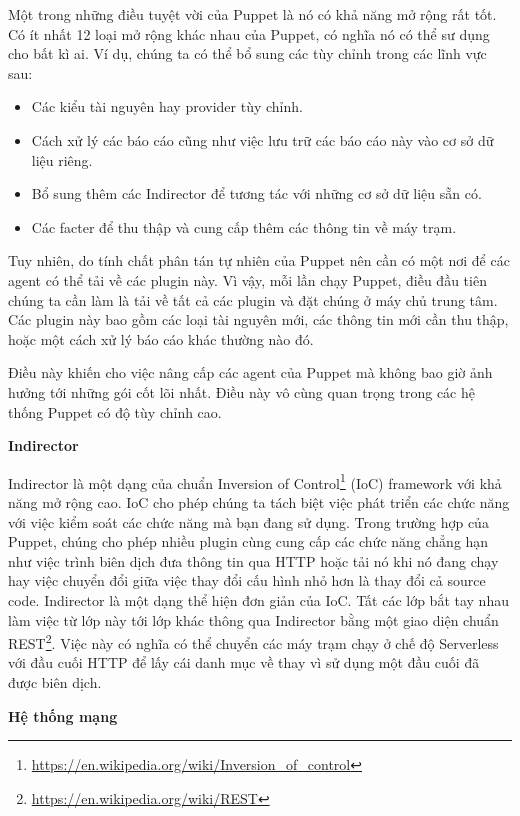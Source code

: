 Một trong những điều tuyệt vời của Puppet là nó có khả năng mở rộng rất tốt. Có ít nhất 12 loại mở rộng khác nhau của Puppet, có nghĩa nó có thể sư dụng cho bất kì ai. Ví dụ, chúng ta có thể bổ sung các tùy chỉnh trong các lĩnh vực sau:

\begin{itemize}
\item Các kiểu tài nguyên hay provider tùy chỉnh.
\item Cách xử lý các báo cáo cũng như việc lưu trữ các báo cáo này vào cơ sở dữ liệu riêng.
\item Bổ sung thêm các Indirector để tương tác với những cơ sở dữ liệu sẵn có.
\item Các facter để thu thập và cung cấp thêm các thông tin về máy trạm.
\end{itemize}

Tuy nhiên, do tính chất phân tán tự nhiên của Puppet nên cần có một nơi để các agent có thể tải về các plugin này. Vì vậy, mỗi lần chạy Puppet, điều đầu tiên chúng ta cần làm là tải về tất cả các plugin và đặt chúng ở máy chủ trung tâm. Các plugin này bao gồm các loại tài nguyên mới, các thông tin mới cần thu thập, hoặc một cách xử lý báo cáo khác thường nào đó.

Điều này khiến cho việc nâng cấp các agent của Puppet mà không bao giờ ảnh hưởng tới những gói cốt lõi nhất. Điều này vô cùng quan trọng trong các hệ thống Puppet có độ tùy chỉnh cao.

\textbf{\large Indirector}


Indirector là một dạng của chuẩn Inversion of Control\footnote{\url{https://en.wikipedia.org/wiki/Inversion_of_control}} (IoC) framework với khả năng mở rộng cao. IoC cho phép chúng ta tách biệt việc phát triển các chức năng với việc kiểm soát các chức năng mà bạn đang sử dụng. Trong trường hợp của Puppet, chúng cho phép nhiều plugin cùng cung cấp các chức năng chẳng hạn như việc trình biên dịch đưa thông tin qua HTTP hoặc tải nó khi nó đang chạy hay việc chuyển đổi giữa việc thay đổi cấu hình nhỏ hơn là thay đổi cả source code. Indirector là một dạng thể hiện đơn giản của IoC. Tất các lớp bắt tay nhau làm việc từ lớp này tới lớp khác thông qua Indirector bằng một giao diện chuẩn REST\footnote{\url{https://en.wikipedia.org/wiki/REST}}. Việc này có nghĩa có thể chuyển các máy trạm chạy ở chế độ Serverless với đầu cuối HTTP để lấy cái danh mục về thay vì sử dụng một đầu cuối đã được biên dịch.

\textbf{\large Hệ thống mạng}


